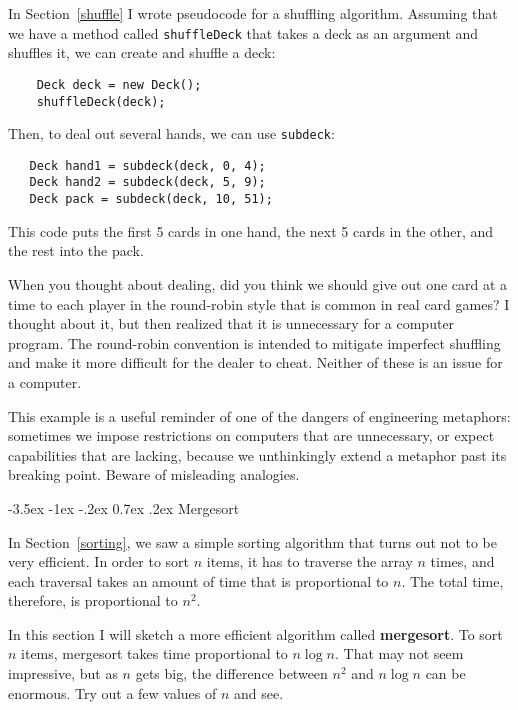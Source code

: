 \documentclass{book}
\makeatletter
\renewcommand{\section}{\@startsection 
    {section} {1} {0mm}%
    {-3.5ex \@plus -1ex \@minus -.2ex}%
    {0.7ex \@plus.2ex}%
    {\normalfont\Large\bfseries}}
\makeatother
\begin{document}
In Section~\ref{shuffle} I wrote pseudocode for a shuffling algorithm.
Assuming that we have a method called {\tt shuffleDeck} that takes
a deck as an argument and shuffles it, we can create and shuffle
a deck:

\begin{verbatim}
    Deck deck = new Deck();
    shuffleDeck(deck);
\end{verbatim}
%
Then, to deal out several hands, we can use {\tt subdeck}:

\begin{verbatim}
   Deck hand1 = subdeck(deck, 0, 4);
   Deck hand2 = subdeck(deck, 5, 9);
   Deck pack = subdeck(deck, 10, 51);
\end{verbatim}
%
This code puts the first 5 cards in one hand, the next 5 cards
in the other, and the rest into the pack.

When you thought about dealing, did you think we should give out one
card at a time to each player in the round-robin style that is common
in real card games?  I thought about it, but then realized that it is
unnecessary for a computer program.  The round-robin convention is
intended to mitigate imperfect shuffling and make it more difficult
for the dealer to cheat.  Neither of these is an issue for a computer.

This example is a useful reminder of one of the dangers of engineering
metaphors: sometimes we impose restrictions on computers that are
unnecessary, or expect capabilities that are lacking, because we
unthinkingly extend a metaphor past its breaking point.  Beware of
misleading analogies.


\section {Mergesort}
\label{mergesort}

In Section~\ref{sorting}, we saw a simple sorting algorithm that turns
out not to be very efficient.  In order to sort $n$ items, it has to
traverse the array $n$ times, and each traversal takes an amount of
time that is proportional to $n$.  The total time, therefore, is
proportional to $n^2$.

In this section I will sketch a more efficient algorithm called {\bf
mergesort}.  To sort $n$ items, mergesort takes time proportional to
$n \log n$.  That may not seem impressive, but as $n$ gets big, the
difference between $n^2$ and $n \log n$ can be enormous.  Try out a
few values of $n$ and see.
\end{document}
